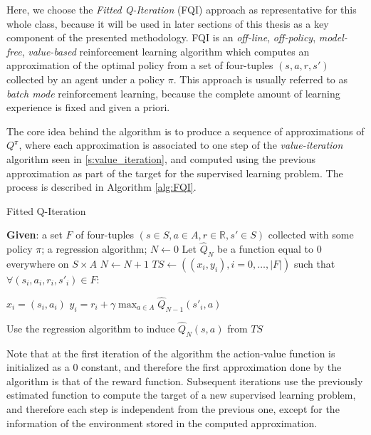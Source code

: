 Here, we choose the \textit{Fitted Q-Iteration} (FQI) approach as representative
for this whole class, because it will be used in later sections of this thesis 
as a key component of the presented methodology.
FQI is an \textit{off-line}, \textit{off-policy}, \textit{model-free}, 
\textit{value-based} reinforcement learning algorithm which computes an 
approximation of the optimal policy from a set of four-tuples $(s, a, r, s')$
collected by an agent under a policy $\pi$.
This approach is usually referred to as \textit{batch mode} reinforcement 
learning, because the complete amount of learning experience is fixed and given
a priori.

The core idea behind the algorithm is to produce a sequence of approximations of
$Q^\pi$, where each approximation is associated to one step of the 
\textit{value-iteration} algorithm seen in \ref{s:value_iteration}, and computed
using the previous approximation as part of the target for the supervised 
learning problem. The process is described in Algorithm \ref{alg:FQI}.
%
\begin{algorithm}[h]
    \caption{Fitted Q-Iteration}
    \label{alg:FQI}
    \begin{algorithmic}
        \STATE \textbf{Given}: a set $F$ of four-tuples $(s \in S, a \in A, r \in \mathbb{R}, s' \in S)$ collected with some policy $\pi$; a regression algorithm;
        \STATE $N \leftarrow 0$
        \STATE Let $\hat{Q}_N$ be a function equal to $0$ everywhere on $S \times A$
        \REPEAT
	    \STATE $N \leftarrow N+1$
	    \STATE $TS \leftarrow ((x_i, y_i), i = 0, \dots, |F|)$ such that $\forall (s_i, a_i, r_i, s'_i) \in F$:
		\begin{ALC@g}
		\STATE $x_i = (s_i, a_i)$
		\STATE $y_i = r_i + \gamma \max_{a \in A} \hat{Q}_{N-1} (s'_i, a)$
		\end{ALC@g}
	    \STATE Use the regression algorithm to induce $\hat{Q}_N(s, a)$ from $TS$
    \end{algorithmic}
\end{algorithm}
%

Note that at the first iteration of the algorithm the action-value function is
initialized as a $0$ constant, and therefore the first approximation done by the 
algorithm is that of the reward function.
Subsequent iterations use the previously estimated function to compute the 
target of a new supervised learning problem, and therefore each step is 
independent from the previous one, except for the information of the environment 
stored in the computed approximation. 

